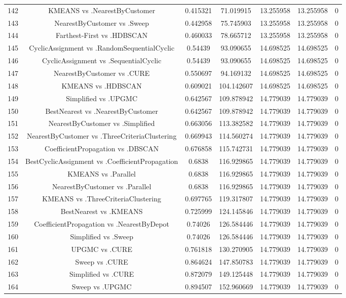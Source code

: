 \documentclass[a4paper,10pt]{article}
\begin{document}
\begin{landscape}
\begin{table}[!htp]
\begin{tabular}{ccccccc}
142&KMEANS vs .NearestByCustomer&0.415321&71.019915&13.255958&13.255958&0\\
143&NearestByCustomer vs .Sweep&0.442958&75.745903&13.255958&13.255958&0\\
144&Farthest-First vs .HDBSCAN&0.460033&78.665712&13.255958&13.255958&0\\
145&CyclicAssignment vs .RandomSequentialCyclic&0.54439&93.090655&14.698525&14.698525&0\\
146&CyclicAssignment vs .SequentialCyclic&0.54439&93.090655&14.698525&14.698525&0\\
147&NearestByCustomer vs .CURE&0.550697&94.169132&14.698525&14.698525&0\\
148&KMEANS vs .HDBSCAN&0.609021&104.142607&14.698525&14.698525&0\\
149&Simplified vs .UPGMC&0.642567&109.878942&14.779039&14.779039&0\\
150&BestNearest vs .NearestByCustomer&0.642567&109.878942&14.779039&14.779039&0\\
151&NearestByCustomer vs .Simplified&0.663056&113.382582&14.779039&14.779039&0\\
152&NearestByCustomer vs .ThreeCriteriaClustering&0.669943&114.560274&14.779039&14.779039&0\\
153&CoefficientPropagation vs .DBSCAN&0.676858&115.742731&14.779039&14.779039&0\\
154&BestCyclicAssignment vs .CoefficientPropagation&0.6838&116.929865&14.779039&14.779039&0\\
155&KMEANS vs .Parallel&0.6838&116.929865&14.779039&14.779039&0\\
156&NearestByCustomer vs .Parallel&0.6838&116.929865&14.779039&14.779039&0\\
157&KMEANS vs .ThreeCriteriaClustering&0.697765&119.317807&14.779039&14.779039&0\\
158&BestNearest vs .KMEANS&0.725999&124.145846&14.779039&14.779039&0\\
159&CoefficientPropagation vs .NearestByDepot&0.74026&126.584446&14.779039&14.779039&0\\
160&Simplified vs .Sweep&0.74026&126.584446&14.779039&14.779039&0\\
161&UPGMC vs .CURE&0.761818&130.270905&14.779039&14.779039&0\\
162&Sweep vs .CURE&0.864624&147.850783&14.779039&14.779039&0\\
163&Simplified vs .CURE&0.872079&149.125448&14.779039&14.779039&0\\
164&Sweep vs .UPGMC&0.894507&152.960669&14.779039&14.779039&0\\

\end{tabular}
\end{table}
\end{landscape}
\end{document}
